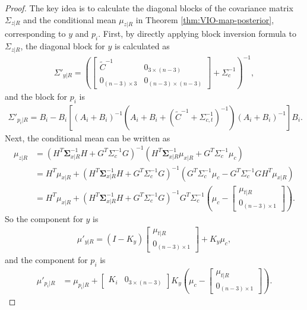 \begin{proof}
	The key idea is to calculate the diagonal blocks of the covariance matrix $\Sigma_{z|R}$ and the conditional mean $\mu_{z|R}$ in Theorem \ref{thm:VIO-map-posterior}, corresponding to $y$ and $p_i$.
	First, by directly applying block inversion formula to $\Sigma_{z|R}$, the diagonal block for $y$ is calculated as
	\begin{align*}
		\Sigma'_{y|R} = \left( \begin{bmatrix} \tilde{C}^{-1} & 0_{3\times (n-3)} \\ 0_{(n-3)\times 3} & 0_{(n-3)\times (n-3)} \end{bmatrix} + \Sigma_c^{-1} \right)^{-1},
	\end{align*}
	and the block for $p_i$ is
	\begin{align*}
		\Sigma'_{p_i|R} = B_i - B_i\left[ (A_i+B_i)^{-1} \left( A_i + B_i + (\tilde{C}^{-1} + \Sigma_{c,t}^{-1})^{-1} \right) (A_i+B_i)^{-1} \right] B_i.
	\end{align*}
	Next, the conditional mean can be written as
	\begin{align*}
		\mu_{z|R} &= \left( H^T\bm{\Sigma}_{x|R}^{-1}H + G^T\Sigma_c^{-1}G \right)^{-1} \left( H^T\bm{\Sigma}_{x|R}^{-1}\mu_{x|R} + G^T\Sigma_c^{-1}\mu_c \right) \\
		&= H^T\mu_{x|R} + \left( H^T\bm{\Sigma}_{x|R}^{-1}H + G^T\Sigma_c^{-1}G \right)^{-1} \left( G^T\Sigma_c^{-1}\mu_c - G^T\Sigma_c^{-1}GH^T\mu_{x|R} \right) \nonumber \\
		&= H^T\mu_{x|R} + \left( H^T\bm{\Sigma}_{x|R}^{-1}H + G^T\Sigma_c^{-1}G \right)^{-1} G^T\Sigma_c^{-1} \left( \mu_c - \begin{bmatrix} \mu_{t|R} \\ 0_{(n-3)\times 1} \end{bmatrix} \right).
	\end{align*}
	So the component for $y$ is
	\begin{align*}
		\mu'_{y|R} = (I-K_y) \begin{bmatrix} \mu_{t|R} \\ 0_{(n-3)\times 1} \end{bmatrix} + K_y\mu_c,
	\end{align*}
	and the component for $p_i$ is
	\begin{align*}
		\mu'_{p_i|R} &= \mu_{p_i|R} + \begin{bmatrix} K_i & 0_{3\times (n-3)}  \end{bmatrix} K_y \left( \mu_c - \begin{bmatrix} \mu_{t|R} \\ 0_{(n-3)\times 1} \end{bmatrix} \right).

\end{align*}
\end{proof}

